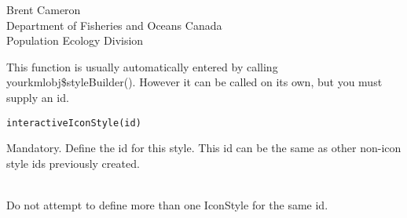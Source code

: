 \documentclass[a4paper]{book}
\begin{document}
%
\begin{Author}\relax
Brent Cameron\\{}
Department of Fisheries and Oceans Canada\\{}
Population Ecology Division
\end{Author}
%
\begin{Examples}
\end{Examples}
%
\begin{Description}\relax
This function is usually automatically entered by calling yourkmlobj\$styleBuilder(). However it can be called on its own, but you must supply an id.
\end{Description}
%
\begin{Usage}
\begin{verbatim}
interactiveIconStyle(id)
\end{verbatim}
\end{Usage}
%
\begin{Arguments}
\begin{ldescription}
\item[\code{id}] 
Mandatory. Define the id for this style. This id can be the same as other non-icon style ids previously created.

\end{ldescription}
\end{Arguments}
%
\begin{Note}\relax
{}\\{}
Do not attempt to define more than one IconStyle for the same id.

\end{Note}
\end{document}
